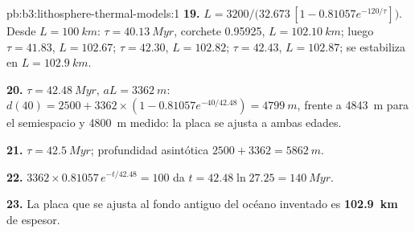 \begin{solution}{pb:b3:lithosphere-thermal-models:1}
\textbf{19.} $L = 3200/\bigl(32.673\,[1 - 0.81057e^{-120/\tau}]\bigr)$. Desde
$L = \qty{100}{km}$: $\tau = \qty{40.13}{Myr}$, corchete 0.95925, $L =
\qty{102.10}{km}$; luego $\tau = 41.83$, $L = 102.67$; $\tau = 42.30$, $L =
102.82$; $\tau = 42.43$, $L = 102.87$; se estabiliza en $L = \qty{102.9}{km}$.

\textbf{20.} $\tau = \qty{42.48}{Myr}$, $aL = \qty{3362}{m}$: $d(40) = 2500 +
3362\times(1 - 0.81057e^{-40/42.48}) = \qty{4799}{m}$, frente a \qty{4843}{m}
para el semiespacio y \qty{4800}{m} medido: la placa se ajusta a ambas edades.

\textbf{21.} $\tau = \qty{42.5}{Myr}$; profundidad asintótica $2500 + 3362 =
\qty{5862}{m}$.

\textbf{22.} $3362\times0.81057\,e^{-t/42.48} = 100$ da $t = 42.48\ln27.25 =
\qty{140}{Myr}$.

\textbf{23.} La placa que se ajusta al fondo antiguo del océano inventado es
\textbf{\qty[text-series-to-math=true]{102.9}{km}} de espesor.
\end{solution}
